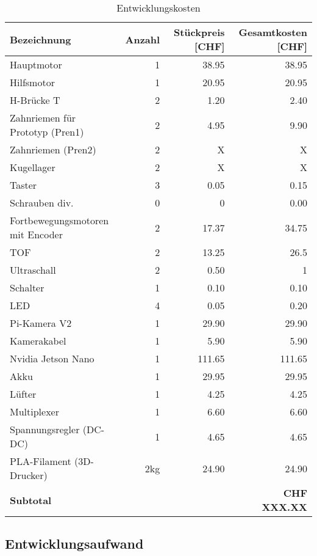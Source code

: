 \begin{center}
\centering
\begin{table}[H]
\begin{tabular}{|l|r|r|r|}
\hline 
\textbf{Bezeichnung} & \textbf{Anzahl} &
\textbf{Stückpreis [CHF]} & \textbf{Gesamtkosten [CHF]} \\
\hline 
Hauptmotor & 1 & 38.95 & 38.95 \\
\hline
Hilfsmotor & 1 & 20.95 & 20.95 \\
\hline
H-Brücke T & 2 & 1.20 & 2.40 \\
\hline
Zahnriemen für Prototyp (Pren1) & 2 & 4.95 & 9.90 \\
\hline
Zahnriemen (Pren2)  & 2 & X & X \\
\hline
Kugellager & 2 & X & X \\
\hline
Taster & 3 & 0.05  & 0.15 \\
\hline
Schrauben div. & 0 & 0 & 0.00 \\
\hline
Fortbewegungsmotoren mit Encoder & 2 & 17.37 & 34.75 \\
\hline
TOF & 2 & 13.25 & 26.5 \\
\hline
Ultraschall & 2 & 0.50 & 1 \\
\hline
Schalter & 1 & 0.10 & 0.10 \\
\hline
LED & 4 & 0.05 & 0.20 \\
\hline
Pi-Kamera V2 & 1 & 29.90 & 29.90 \\
\hline
Kamerakabel & 1 & 5.90 & 5.90 \\
\hline
Nvidia Jetson Nano & 1 & 111.65 & 111.65 \\
\hline
Akku & 1 & 29.95 & 29.95 \\
\hline
Lüfter & 1 & 4.25 & 4.25 \\
\hline
Multiplexer & 1 & 6.60 & 6.60 \\
\hline
Spannungsregler (DC-DC) & 1 & 4.65 & 4.65 \\
\hline
PLA-Filament (3D-Drucker) & 2kg & 24.90 & 24.90 \\
\hline

\hline \hline 
 \textbf{Subtotal} &&& \textbf{CHF XXX.XX}\\
\hline 
\end{tabular}
\caption[Entwicklungskosten]{Entwicklungskosten}
\label{tab:kosten}
\end{table}
\end{center}

\newpage

\subsection{Entwicklungsaufwand}

